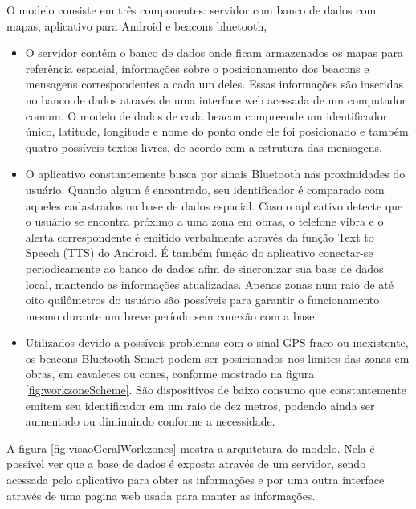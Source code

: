 \documentclass[english,brazilian]{UNISINOSmonografia}
\begin{document}
O modelo consiste em três componentes: servidor com banco de dados com mapas, aplicativo para Android e beacons bluetooth, 
\begin{itemize}
	\item O servidor contém o banco de dados onde ficam armazenados os mapas para referência espacial, informações sobre o posicionamento dos beacons e mensagens correspondentes a cada um deles. Essas informações são inseridas no banco de dados através de uma interface web acessada de um computador comum. O modelo de dados de cada beacon compreende um identificador único, latitude, longitude e nome do ponto onde ele foi posicionado e também quatro possíveis textos livres, de acordo com a estrutura das mensagens.

	\item O aplicativo constantemente busca por sinais Bluetooth nas proximidades do usuário. Quando algum é encontrado, seu identificador é comparado com aqueles cadastrados na base de dados espacial. Caso o aplicativo detecte que o usuário se encontra próximo a uma zona em obras, o telefone vibra e o alerta correspondente é emitido verbalmente através da função Text to Speech (TTS) do Android. É também função do aplicativo conectar-se periodicamente ao banco de dados afim de sincronizar sua base de dados local, mantendo as informações atualizadas. Apenas zonas num raio de até oito quilômetros do usuário são possíveis para garantir o funcionamento mesmo durante um breve período sem conexão com a base.
	
	\item Utilizados devido a possíveis problemas com o sinal GPS fraco ou inexistente, os beacons Bluetooth Smart podem ser posicionados nos limites das zonas em obras, em cavaletes ou cones, conforme mostrado na figura \ref{fig:workzoneScheme}. São dispositivos de baixo consumo que constantemente emitem seu identificador em um raio de dez metros, podendo ainda ser aumentado ou diminuindo conforme a necessidade.
\end{itemize}

A figura \ref{fig:visaoGeralWorkzones} mostra a arquitetura do modelo. Nela é possivel ver que a base de dados é exposta através de um servidor, sendo acessada pelo aplicativo para obter as informações e por uma outra interface através de uma pagina web usada para manter as informações.
\end{document}
